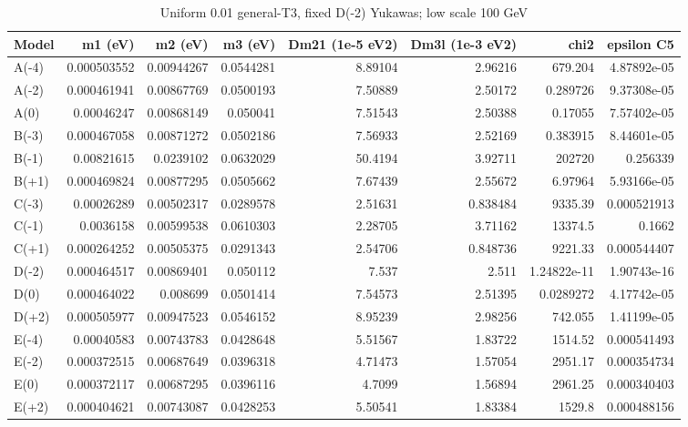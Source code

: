 \begin{table}[htbp]
\centering
\small
\caption{Uniform 0.01 general-T3, fixed D(-2) Yukawas; low scale 100 GeV}
\label{tab:table_C1_Dm2}
\begin{tabular}{lrrrrrrr}
\hline
Model & m1 (eV) & m2 (eV) & m3 (eV) & Dm21 (1e-5 eV2) & Dm3l (1e-3 eV2) & chi2 & epsilon C5 \\
\hline
A(-4) & 0.000503552 & 0.00944267 & 0.0544281 & 8.89104 & 2.96216 & 679.204 & 4.87892e-05 \\
A(-2) & 0.000461941 & 0.00867769 & 0.0500193 & 7.50889 & 2.50172 & 0.289726 & 9.37308e-05 \\
A(0) & 0.00046247 & 0.00868149 & 0.050041 & 7.51543 & 2.50388 & 0.17055 & 7.57402e-05 \\
B(-3) & 0.000467058 & 0.00871272 & 0.0502186 & 7.56933 & 2.52169 & 0.383915 & 8.44601e-05 \\
B(-1) & 0.00821615 & 0.0239102 & 0.0632029 & 50.4194 & 3.92711 & 202720 & 0.256339 \\
B(+1) & 0.000469824 & 0.00877295 & 0.0505662 & 7.67439 & 2.55672 & 6.97964 & 5.93166e-05 \\
C(-3) & 0.00026289 & 0.00502317 & 0.0289578 & 2.51631 & 0.838484 & 9335.39 & 0.000521913 \\
C(-1) & 0.0036158 & 0.00599538 & 0.0610303 & 2.28705 & 3.71162 & 13374.5 & 0.1662 \\
C(+1) & 0.000264252 & 0.00505375 & 0.0291343 & 2.54706 & 0.848736 & 9221.33 & 0.000544407 \\
D(-2) & 0.000464517 & 0.00869401 & 0.050112 & 7.537 & 2.511 & 1.24822e-11 & 1.90743e-16 \\
D(0) & 0.000464022 & 0.008699 & 0.0501414 & 7.54573 & 2.51395 & 0.0289272 & 4.17742e-05 \\
D(+2) & 0.000505977 & 0.00947523 & 0.0546152 & 8.95239 & 2.98256 & 742.055 & 1.41199e-05 \\
E(-4) & 0.00040583 & 0.00743783 & 0.0428648 & 5.51567 & 1.83722 & 1514.52 & 0.000541493 \\
E(-2) & 0.000372515 & 0.00687649 & 0.0396318 & 4.71473 & 1.57054 & 2951.17 & 0.000354734 \\
E(0) & 0.000372117 & 0.00687295 & 0.0396116 & 4.7099 & 1.56894 & 2961.25 & 0.000340403 \\
E(+2) & 0.000404621 & 0.00743087 & 0.0428253 & 5.50541 & 1.83384 & 1529.8 & 0.000488156 \\
\hline
\end{tabular}
\end{table}
